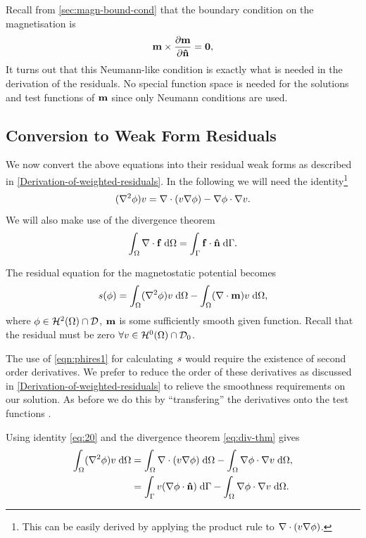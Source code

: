 Recall from \cref{sec:magn-bound-cond} that the boundary condition on the magnetisation is
\begin{equation}
  \label{eq:m-bc}
  \mathbf{m} \times \frac{\partial \mathbf{m}}{\partial \mathbf{\hat{n}}} = \mathbf{0},
\end{equation}
It turns out that this Neumann-like condition is exactly what is needed in the derivation of the residuals.
No special function space is needed for the solutions and test functions of $\mathbf{m}$ since only Neumann conditions are used.


\subsection{Conversion to Weak Form Residuals}

We now convert the above equations into their residual weak forms as described in \cref{Derivation-of-weighted-residuals}.
In the following we will need the identity\footnote{This can be easily derived by applying the product rule to $\nabla \cdot (v \nabla \phi)$.}
\begin{equation}
  (\nabla^2 \phi) v = \nabla \cdot (v \nabla \phi) - \nabla \phi \cdot \nabla v.
  \label{eq:20}
\end{equation}
We will also make use of the divergence theorem
\begin{equation}
  {\int_{\Omega} \nabla \cdot{\mathbf{f}}{\; \text{d}}{\Omega}} = {\int_{{\Gamma}} {\mathbf{f}} \cdot \mathbf{\hat{n}} {\; \text{d}} {{\Gamma}}}.
  \label{eq:div-thm}
\end{equation}

The residual equation for the magnetostatic potential becomes
\begin{gather}
  s(\phi) = {\int_{\Omega}  (\nabla^2 \phi) v  {\; \text{d}} {\Omega}}
  - {\int_{\Omega}  (\nabla \cdot \mathbf{m}) v {\; \text{d}} {\Omega}}, \label{eqn:phires1}
\end{gather}
where $\phi \in \mathcal{H}^2(\Omega) \cap \mathcal{D}$, $\mathbf{m}$ is some sufficiently smooth given function.
Recall that the  residual must be zero $\forall v \in \mathcal{H}^0(\Omega) \cap \mathcal{D}_0$.

The use of \cref{eqn:phires1} for calculating $s$ would require the existence of second order derivatives.
We prefer to reduce the order of these derivatives as discussed in \cref{Derivation-of-weighted-residuals} to relieve the smoothness requirements on our solution.
As before we do this by ``transfering'' the derivatives onto the test functions \cite{HowardElmanDavidSilvester2006}.

Using identity \cref{eq:20} and the divergence theorem \cref{eq:div-thm} gives
\begin{equation}
  \begin{aligned}
    {\int_{\Omega}  (\nabla^2\phi) v{\; \text{d}}{\Omega}} &=  {\int_{\Omega} \nabla \cdot (v \nabla \phi) {\; \text{d}} {\Omega}}
           - {\int_{\Omega} \nabla \phi \cdot \nabla v {\; \text{d}} {\Omega}},\\
    &= {\int_{{\Gamma}} v (\nabla \phi \cdot \mathbf{\hat{n}}) {\; \text{d}} {{\Gamma}}} 
    - {\int_{\Omega}  \nabla \phi \cdot \nabla v {\; \text{d}} {\Omega}}.
    \label{eqn:identitygauss}
  \end{aligned} 
\end{equation}

